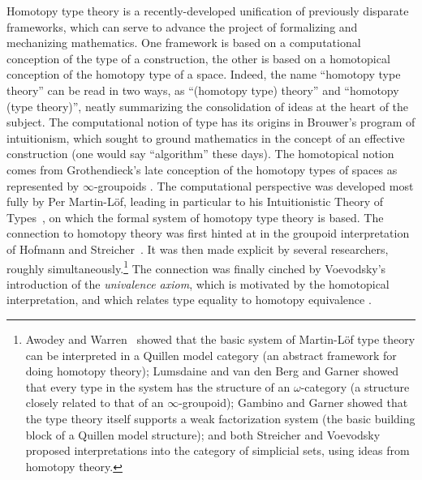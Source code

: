 \documentclass[11pt]{article}
\theoremstyle{remark}
\theoremstyle{definition}
\begin{document}
\noindent Homotopy type theory is a recently-developed unification of previously disparate frameworks, which can serve to advance the project of formalizing and mechanizing mathematics.  One framework is based on a computational conception of the type of a construction, the other is based on a homotopical conception of the homotopy type of a space.  Indeed, the name ``homotopy type theory'' can be read in two ways, as
``(homotopy type) theory'' and ``homotopy (type theory)'', neatly summarizing the consolidation of ideas at the heart of
the subject.  The computational notion of type has its origins in Brouwer's program of intuitionism, which sought to
ground mathematics in the concept of an effective construction (one would say ``algorithm'' these days).  The
homotopical notion comes from Grothendieck's late conception of the homotopy types of spaces as represented by  $\infty$-groupoids \cite{GrothPS}.  The computational perspective was developed most fully by Per Martin-L\"{o}f, leading in
particular to his Intuitionistic Theory of Types~\cite{mltt}, on which the formal system of homotopy type theory is
based.  The connection to homotopy theory was first hinted at in the groupoid interpretation of Hofmann and
Streicher~\cite{HS,HofmannM:gromtt}.  It was then made explicit by several researchers, roughly simultaneously.\footnote{%
Awodey and Warren~\cite{AW} showed that the basic system of Martin-L\"{o}f type theory can be interpreted in a Quillen model category (an abstract framework for doing homotopy theory); Lumsdaine \cite{L} and van den Berg and Garner \cite{vandenBergB:typwg} showed that every type in the system has the structure of an $\omega$-category (a structure closely related to that of an $\infty$-groupoid); Gambino and Garner \cite{GG} showed that the type theory itself supports a weak factorization system (the basic building block of a Quillen model structure); and both Streicher \cite{StreicherNote} and Voevodsky \cite{VVnote} proposed interpretations into the category of simplicial sets, using ideas from homotopy theory.}
The connection was finally cinched by Voevodsky's introduction of the \emph{univalence axiom}, which is motivated by the homotopical interpretation, and which relates type equality to homotopy equivalence \cite{KLV,APW}.

\end{document}
